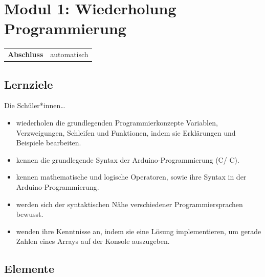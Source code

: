 \documentclass[a4paper]{article}
\def\CC{{C\nolinebreak[4]\hspace{-.05em}\raisebox{.4ex}{\tiny\bf ++}}}
\begin{document}
\section{Modul 1: Wiederholung Programmierung}
\begin{tabular}{@{}l l}
    \textbf{Abschluss} & automatisch
\end{tabular}
\subsection{Lernziele}
Die Schüler*innen\dots
\begin{itemize}
    \item wiederholen die grundlegenden Programmierkonzepte Variablen, Verzweigungen, Schleifen und Funktionen, indem sie Erklärungen und Beispiele bearbeiten.
    \item kennen die grundlegende Syntax der Arduino-Programmierung (C/ \CC).
    \item kennen mathematische und logische Operatoren, sowie ihre Syntax in der Arduino-Programmierung.
    \item werden sich der syntaktischen Nähe verschiedener Programmiersprachen bewusst.
    \item wenden ihre Kenntnisse an, indem sie eine Lösung implementieren, um gerade Zahlen eines Arrays auf der Konsole auszugeben.
\end{itemize}

\subsection{Elemente}
\end{document}
